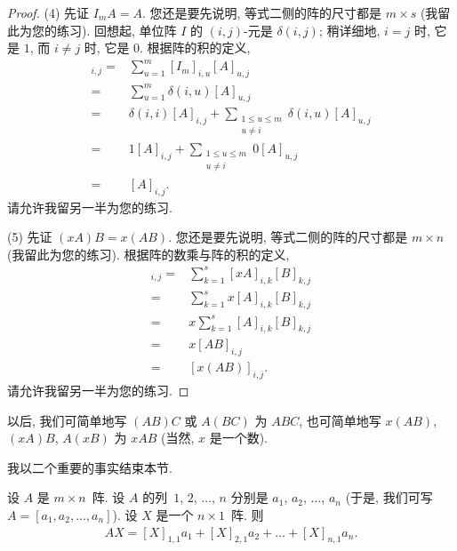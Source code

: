 \documentclass[%
    UTF8,%
    fontset=none,%
    punct=kaiming,%
    zihao=-4,%
    a4paper,%
    oneside,%
]{ctexbook}
\renewcommand*{\leq}{\leqslant}
\begin{document}
\begin{proof}
    (4)
    先证 \(I_m A = A\).
    您还是要先说明, 等式二侧的阵的尺寸都是 \(m \times s\)
    (我留此为您的练习).
    回想起, 单位阵 \(I\) 的 \((i, j)\)-元是
    \(\delta(i, j)\);
    稍详细地, \(i = j\) 时, 它是 \(1\),
    而 \(i \neq j\) 时, 它是 \(0\).
    根据阵的积的定义,
    \begin{align*}
        [I_m A]_{i,j}
        = {} &
        \sum_{u = 1}^{m} {[I_m]_{i,u} [A]_{u,j}}
        \\
        = {} &
        \sum_{u = 1}^{m} {\delta(i, u) [A]_{u,j}}
        \\
        = {} &
        \delta(i, i) [A]_{i,j}
        + \sum_{\substack{1 \leq u \leq m \\ u \neq i}}
        {\delta(i, u) [A]_{u,j}}
        \\
        = {} &
        1 [A]_{i,j}
        + \sum_{\substack{1 \leq u \leq m \\ u \neq i}}
        {0 [A]_{u,j}}
        \\
        = {} & [A]_{i,j}.
    \end{align*}
    请允许我留另一半为您的练习.

    (5)
    先证 \((xA)B = x(AB)\).
    您还是要先说明, 等式二侧的阵的尺寸都是 \(m \times n\)
    (我留此为您的练习).
    根据阵的数乘与阵的积的定义,
    \begin{align*}
        [(xA)B]_{i,j}
        = {} &
        \sum_{k = 1}^{s} {[xA]_{i,k} [B]_{k,j}}
        \\
        = {} &
        \sum_{k = 1}^{s} {x[A]_{i,k} [B]_{k,j}}
        \\
        = {} &
        x \sum_{k = 1}^{s} {[A]_{i,k} [B]_{k,j}}
        \\
        = {} &
        x [AB]_{i,j}
        \\
        = {} &
        [x(AB)]_{i,j}.
    \end{align*}
    请允许我留另一半为您的练习.
\end{proof}

以后, 我们可简单地写 \((AB)C\) 或 \(A(BC)\) 为 \(ABC\),
也可简单地写 \(x(AB)\), \((xA)B\), \(A(xB)\)
为 \(xAB\)
(当然, \(x\) 是一个数).

\vspace{2ex}

我以二个重要的事实结束本节.

\begin{theorem}
    设 \(A\) 是 \(m \times n\)~阵.
    设 \(A\) 的列~\(1\), \(2\), \(\dots\), \(n\)
    分别是 \(a_1\), \(a_2\), \(\dots\), \(a_n\)
    (于是, 我们可写 \(A = [a_1, a_2, \dots, a_n]\)).
    设 \(X\) 是一个 \(n \times 1\)~阵.
    则
    \begin{align*}
        AX = [X]_{1,1} a_1 + [X]_{2,1} a_2 + \dots
        + [X]_{n,1} a_n.
    \end{align*}
\end{theorem}
\end{document}
